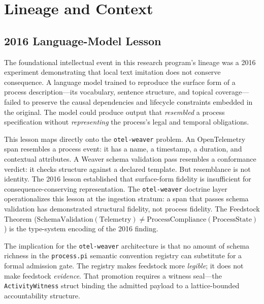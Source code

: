 
\section{Lineage and Context}
\label{sec:otel-weaver-lineage}

\subsection{2016 Language-Model Lesson}
\label{sec:otel-weaver-lineage-2016}

The foundational intellectual event in this research program's lineage was a 2016 experiment
demonstrating that local text imitation does not conserve consequence. A language model trained
to reproduce the surface form of a process description---its vocabulary, sentence structure,
and topical coverage---failed to preserve the causal dependencies and lifecycle constraints
embedded in the original. The model could produce output that \emph{resembled} a process
specification without \emph{representing} the process's legal and temporal obligations.

This lesson maps directly onto the \texttt{otel-weaver} problem. An OpenTelemetry span resembles
a process event: it has a name, a timestamp, a duration, and contextual attributes. A Weaver
schema validation pass resembles a conformance verdict: it checks structure against a declared
template. But resemblance is not identity. The 2016 lesson established that surface-form fidelity
is insufficient for consequence-conserving representation. The \texttt{otel-weaver} doctrine layer
operationalizes this lesson at the ingestion stratum: a span that passes schema validation has
demonstrated structural fidelity, not process fidelity. The Feedstock Theorem
($\text{SchemaValidation}(\text{Telemetry}) \neq \text{ProcessCompliance}(\text{ProcessState})$)
is the type-system encoding of the 2016 finding.

The implication for the \texttt{otel-weaver} architecture is that no amount of schema richness
in the \texttt{process.pi} semantic convention registry can substitute for a formal admission
gate. The registry makes feedstock more \emph{legible}; it does not make feedstock
\emph{evidence}. That promotion requires a witness seal---the \texttt{ActivityWitness} struct
binding the admitted payload to a lattice-bounded accountability structure.

